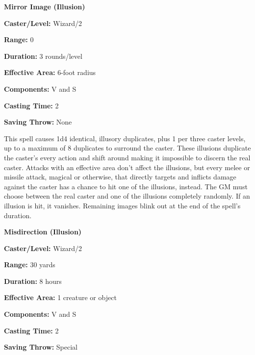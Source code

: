 \begin{multicols}{2}
\vspace{1em}

\noindent
\begin{minipage}{\columnwidth}

\noindent \textbf{Mirror Image (Illusion)}

\noindent \textbf{Caster/Level:} Wizard/2

\noindent \textbf{Range:} 0

\noindent \textbf{Duration:} 3 rounds/level

\noindent \textbf{Effective Area:} 6-foot radius

\noindent \textbf{Components:} V and S

\noindent \textbf{Casting Time:} 2

\noindent \textbf{Saving Throw:} None

\end{minipage}

This spell causes 1d4 identical, illusory duplicates, plus 1 per three caster levels, up to a maximum of 8 duplicates to surround the caster.  These illusions duplicate the caster's every action and shift around making it impossible to discern the real caster.  Attacks with an effective area don't affect the illusions, but every melee or missile attack, magical or otherwise, that directly targets and inflicts damage against the caster has a chance to hit one of the illusions, instead.  The GM must choose between the real caster and one of the illusions completely randomly.  If an illusion is hit, it vanishes.  Remaining images blink out at the end of the spell's duration.  

\vspace{1em}

\noindent
\begin{minipage}{\columnwidth}

\noindent \textbf{Misdirection (Illusion)}

\noindent \textbf{Caster/Level:} Wizard/2

\noindent \textbf{Range:} 30 yards

\noindent \textbf{Duration:} 8 hours

\noindent \textbf{Effective Area:} 1 creature or object

\noindent \textbf{Components:} V and S

\noindent \textbf{Casting Time:} 2

\noindent \textbf{Saving Throw:} Special

\end{minipage}


\end{multicols}
